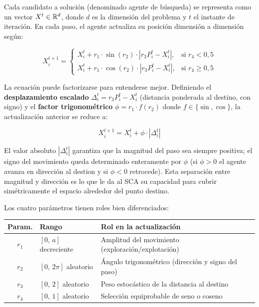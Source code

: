 \documentclass[12pt,a4paper]{article}
\begin{document}
Cada candidato a solución (denominado agente de búsqueda) se representa como un vector $X^t \in \mathbb{R}^d$, donde $d$ es la dimensión del problema y $t$ el instante de iteración. En cada paso, el agente actualiza su posición {dimensión a dimensión} según:

\begin{equation}
X_i^{t+1} =
\begin{cases}
X_i^t + r_1 \cdot \sin(r_2) \cdot \left| r_3 P_i^t - X_i^t \right|, & \text{si } r_4 < 0{,}5 \\[6pt]
X_i^t + r_1 \cdot \cos(r_2) \cdot \left| r_3 P_i^t - X_i^t \right|, & \text{si } r_4 \geq 0{,}5
\end{cases}
\label{eq:update}
\end{equation}

La ecuación puede factorizarse para entenderse mejor. Definiendo el \textbf{desplazamiento escalado} $\Delta_i^t = r_3 P_i^t - X_i^t$ (distancia ponderada al destino, con signo) y el \textbf{factor trigonométrico} $\phi = r_1 \cdot f(r_2)$ donde $f \in \{\sin, \cos\}$, la actualización anterior se reduce a:

\begin{equation}
X_i^{t+1} = X_i^t + \phi \cdot |\Delta_i^t|
\label{eq:factored}
\end{equation}

El valor absoluto $|\Delta_i^t|$ garantiza que la magnitud del paso sea siempre positiva; el {signo} del movimiento queda determinado enteramente por $\phi$ (si $\phi > 0$ el agente avanza en dirección al destion y si $\phi < 0$ retrocede). Esta separación entre magnitud y dirección es lo que le da al SCA su capacidad para cubrir simétricamente el espacio alrededor del punto destino.

Los cuatro parámetros tienen roles bien diferenciados:

\begin{center}
\begin{tabular}{c l l}
\toprule
\textbf{Param.} & \textbf{Rango} & \textbf{Rol en la actualización} \\
\midrule
$r_1$ & $[0,\,a]$ decreciente & Amplitud del movimiento (exploración/explotación) \\
$r_2$ & $[0,\,2\pi]$ aleatorio & Ángulo trigonométrico (dirección y signo del paso) \\
$r_3$ & $[0,\,2]$ aleatorio  & Peso estocástico de la distancia al destino \\
$r_4$ & $[0,\,1]$ aleatorio  & Selección equiprobable de seno o coseno \\
\bottomrule
\end{tabular}
\end{center}
\end{document}
